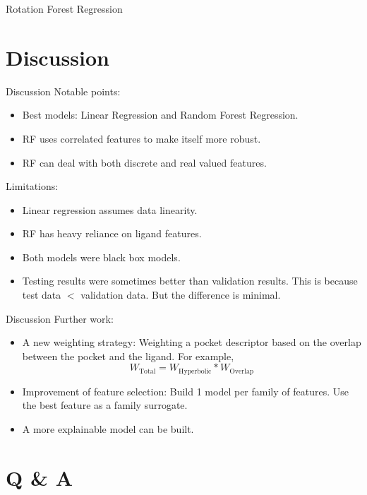 \documentclass{beamer}
\begin{document}
\begin{frame}[t]{Rotation Forest Regression}

\end{frame}

\section{Discussion}
\begin{frame}[t]{Discussion}
Notable points:
\begin{itemize}
\item Best models: Linear Regression and Random Forest Regression.
\item RF uses correlated features to make itself more robust.
\item RF can deal with both discrete and real valued features.
\end{itemize} 
Limitations:
\begin{itemize}
\item Linear regression assumes data linearity.
\item RF has heavy reliance on ligand features.
\item Both models were black box models.
\item Testing results were sometimes better than validation results. This is because test data $<$ validation data.
But the difference is minimal.
\end{itemize} 
\end{frame}

\begin{frame}[t]{Discussion}
Further work:
\begin{itemize}
\item A new weighting strategy: Weighting a pocket descriptor based on the overlap between the pocket and the ligand.  For example,
$$
W_\mathrm{Total} = W_\mathrm{Hyperbolic} * W_\mathrm{Overlap}
$$
\item Improvement of feature selection: Build 1 model per family of features. Use the best feature as a family surrogate.
\item A more explainable model can be built.
\end{itemize} 

\end{frame}

\section{Q \& A}
\end{document}
